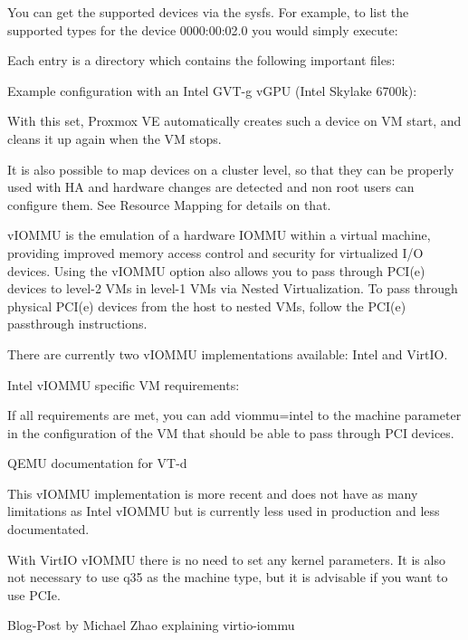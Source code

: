 You can get the supported devices via the sysfs. For example, to list the supported types for the device 0000:00:02.0 you would simply execute:

Each entry is a directory which contains the following important files:

Example configuration with an Intel GVT-g vGPU (Intel Skylake 6700k):

With this set, Proxmox VE automatically creates such a device on VM start, and cleans it up again when the VM stops.

It is also possible to map devices on a cluster level, so that they can be properly used with HA and hardware changes are detected and non root users can configure them. See Resource Mapping for details on that.

vIOMMU is the emulation of a hardware IOMMU within a virtual machine, providing improved memory access control and security for virtualized I/O devices. Using the vIOMMU option also allows you to pass through PCI(e) devices to level-2 VMs in level-1 VMs via Nested Virtualization. To pass through physical PCI(e) devices from the host to nested VMs, follow the PCI(e) passthrough instructions.

There are currently two vIOMMU implementations available: Intel and VirtIO.

Intel vIOMMU specific VM requirements:

If all requirements are met, you can add viommu=intel to the machine parameter in the configuration of the VM that should be able to pass through PCI devices.

QEMU documentation for VT-d

This vIOMMU implementation is more recent and does not have as many limitations as Intel vIOMMU but is currently less used in production and less documentated.

With VirtIO vIOMMU there is no need to set any kernel parameters. It is also not necessary to use q35 as the machine type, but it is advisable if you want to use PCIe.

Blog-Post by Michael Zhao explaining virtio-iommu

